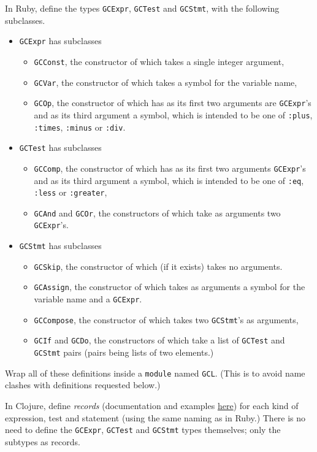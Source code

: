 \documentclass[11pt]{article}
\theoremstyle{definition}
\begin{document}
In Ruby, define the types \texttt{GCExpr}, \texttt{GCTest} and \texttt{GCStmt},
with the following subclasses.
\begin{itemize}
\item \texttt{GCExpr} has subclasses
\begin{itemize}
\item \texttt{GCConst}, the constructor of which takes a single integer argument,
\item \texttt{GCVar}, the constructor of which takes a symbol for the variable name,
\item \texttt{GCOp}, the constructor of which has as its first two arguments are \texttt{GCExpr}'s
and as its third argument a symbol,
which is intended to be one of \texttt{:plus}, \texttt{:times}, \texttt{:minus} or \texttt{:div}.
\end{itemize}
\item \texttt{GCTest} has subclasses
\begin{itemize}
\item \texttt{GCComp}, the constructor of which has as its first two arguments \texttt{GCExpr}'s
and as its third argument a symbol,
which is intended to be one of \texttt{:eq}, \texttt{:less} or \texttt{:greater},
\item \texttt{GCAnd} and \texttt{GCOr}, the constructors of which take as arguments two \texttt{GCExpr}'s.
\end{itemize}
\item \texttt{GCStmt} has subclasses
\begin{itemize}
\item \texttt{GCSkip}, the constructor of which (if it exists) takes no arguments.
\item \texttt{GCAssign}, the constructor of which takes as arguments
a symbol for the variable name and a \texttt{GCExpr}.
\item \texttt{GCCompose}, the constructor of which takes two \texttt{GCStmt}'s as arguments,
\item \texttt{GCIf} and \texttt{GCDo}, the constructors of which
take a list of \texttt{GCTest} and \texttt{GCStmt} pairs
(pairs being lists of two elements.)
\end{itemize}
\end{itemize}

Wrap all of these definitions inside a \texttt{module} named \texttt{GCL}.
(This is to avoid name clashes with definitions requested below.)

In Clojure, define \emph{records} (documentation and examples
\href{https://clojuredocs.org/clojure.core/defrecord}{here}) for each kind of expression, test and statement
(using the same naming as in Ruby.)
There is no need to define the \texttt{GCExpr}, \texttt{GCTest} and \texttt{GCStmt} types themselves;
only the subtypes as records.
\end{document}
